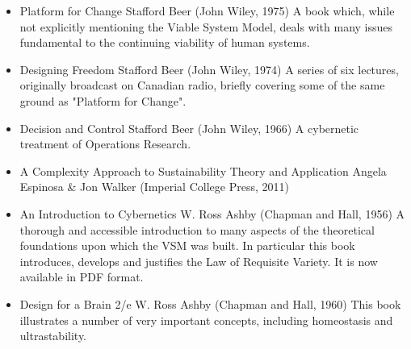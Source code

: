 \begin{itemize}
	\item Platform for Change
	Stafford Beer (John Wiley, 1975)
	A book which, while not explicitly mentioning the Viable System Model, deals with many issues fundamental to the continuing viability of human systems.
	
	\item Designing Freedom
	Stafford Beer (John Wiley, 1974)
	A series of six lectures, originally broadcast on Canadian radio, briefly covering some of the same ground as "Platform for Change".
	
	\item Decision and Control
	Stafford Beer (John Wiley, 1966)
	A cybernetic treatment of Operations Research.
	
	\item A Complexity Approach to Sustainability Theory and Application
	Angela Espinosa \& Jon Walker (Imperial College Press, 2011)
	
	\item An Introduction to Cybernetics
	W. Ross Ashby (Chapman and Hall, 1956)
	A thorough and accessible introduction to many aspects of the theoretical foundations upon which the VSM was built. In particular this book introduces, develops and justifies the Law of Requisite Variety. It is now available in PDF format.
	
	\item Design for a Brain 2/e
	W. Ross Ashby (Chapman and Hall, 1960)
	This book illustrates a number of very important concepts, including homeostasis and ultrastability.
	
\end{itemize}